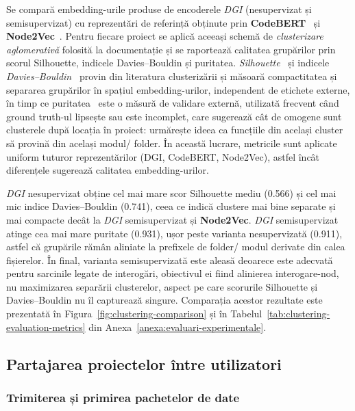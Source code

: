 \documentclass[12pt]{article}
\numberwithin{equation}{section}
\numberwithin{figure}{section}
\numberwithin{table}{section}
\theoremstyle{definition}
\theoremstyle{plain}
\newcounter{anexa}
\begin{document}
Se compară embedding-urile produse de encoderele \textit{DGI} (nesupervizat și semisupervizat) cu reprezentări de referință obținute prin \textbf{CodeBERT}~\cite{feng2020codebert} și \textbf{Node2Vec}~\cite{grover2016node2vec}. Pentru fiecare proiect se aplică aceeași schemă de \textit{clusterizare aglomerativă} folosită la documentație și se raportează calitatea grupărilor prin scorul Silhouette, indicele Davies–Bouldin și puritatea. \textit{Silhouette}~\cite{rousseeuw1987} și indicele \textit{Davies–Bouldin}~\cite{davies1979} provin din literatura clusterizării și măsoară compactitatea și separarea grupărilor în spațiul embedding-urilor, independent de etichete externe, în timp ce puritatea~\cite{manning2008} este o măsură de validare externă, utilizată frecvent când ground truth-ul lipsește sau este incomplet, care sugerează cât de omogene sunt clusterele după locația în proiect: urmărește ideea ca funcțiile din același cluster să provină din același modul/ folder. În această lucrare, metricile sunt aplicate uniform tuturor reprezentărilor (DGI, CodeBERT, Node2Vec), astfel încât diferențele sugerează calitatea embedding-urilor.

\textit{DGI} nesupervizat obține cel mai mare scor Silhouette mediu (0.566) și cel mai mic indice Davies–Bouldin (0.741), ceea ce indică clustere mai bine separate și mai compacte decât la \textit{DGI} semisupervizat și \textbf{Node2Vec}. \textit{DGI} semisupervizat atinge cea mai mare puritate (0.931), ușor peste varianta nesupervizată (0.911), astfel că grupările rămân aliniate la prefixele de folder/ modul derivate din calea fișierelor. În final, varianta semisupervizată este aleasă deoarece este adecvată pentru sarcinile legate de interogări, obiectivul ei fiind alinierea interogare-nod, nu maximizarea separării clusterelor, aspect pe care scorurile Silhouette și Davies–Bouldin nu îl capturează singure. Comparația acestor rezultate este prezentată în Figura~\ref{fig:clustering-comparison} și în Tabelul~\ref{tab:clustering-evaluation-metrics} din Anexa~\ref{anexa:evaluari-experimentale}.

\subsection{Partajarea proiectelor între utilizatori}

\subsubsection{Trimiterea și primirea pachetelor de date}
\end{document}
